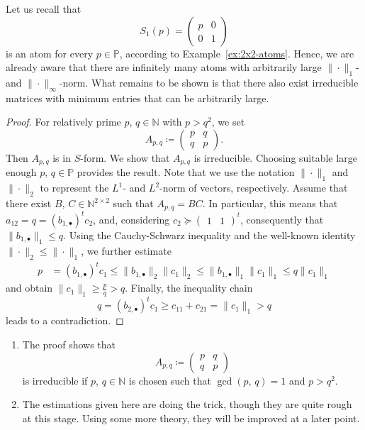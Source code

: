 Let us recall that
\[ S_1(p) = \begin{pmatrix} p & 0 \\ 0 & 1 \end{pmatrix} \]
is an atom for every $p \in \mathbb{P}$, according to Example~\ref{ex:2x2-atoms}. Hence, we are already aware that there are infinitely many atoms with arbitrarily large $\| \cdot \|_{1}$- and $\| \cdot \|_{\infty}$-norm. What remains to be shown is that there also exist irreducible matrices with minimum entries that can be arbitrarily large.

\begin{proof}
For relatively prime $p$, $q \in \mathbb{N}$ with $p > q^2$, we set
\[ A_{p,q} \coloneqq \begin{pmatrix} p & q \\ q & p \end{pmatrix}. \]
Then $A_{p,q}$ is in $S$-form. We show that $A_{p,q}$ is irreducible. Choosing suitable large enough $p$, $q \in \mathbb{P}$ provides the result. Note that we use the notation $\|\cdot\|_1$ and $\|\cdot\|_2$ to represent the $L^1$- and $L^2$-norm of vectors, respectively. Assume that there exist $B$, $C \in \mathbb{N}^{2\times 2}$ such that $A_{p,q} = BC$. In particular, this means that $a_{12} = q = (b_{1,\bullet})^t c_2$, and, considering $c_2 \succeq \begin{pmatrix} 1 & 1\end{pmatrix}^t$, consequently that $\| b_{1,\bullet} \|_1 \leq q$. Using the Cauchy-Schwarz inequality and the well-known identity $\| \cdot \|_2 \leq \| \cdot \|_1$, we further estimate 
\begin{align*}
p &= (b_{1,\bullet})^t c_1 \leq  \| b_{1,\bullet} \|_2 \| c_1 \|_2 \leq \| b_{1,\bullet} \|_1 \| c_1 \|_1 \leq q \| c_1 \|_1
\end{align*}
and obtain $\| c_1 \|_1 \geq \frac{p}{q} > q$. Finally, the inequality chain
\[ q = (b_{2,\bullet})^t c_1 \geq c_{11} + c_{21} = \| c_1 \|_1 > q \]
leads to a contradiction.
\end{proof}

\begin{remark*}
\mbox{}\vspace{-2\topskip}
\begin{enumerate}[label=(\alph*)]
\item The proof shows that 
\[ A_{p,q} \coloneqq \begin{pmatrix}  p & q \\ q & p \end{pmatrix} \]
is irreducible if $p$, $q \in \mathbb{N}$ is chosen such that $\gcd(p, \, q) = 1$ and $p > q^2$.
\item The estimations given here are doing the trick, though they are quite rough at this stage. Using some more theory, they will be improved at a later point.
\end{enumerate}
\end{remark*}

